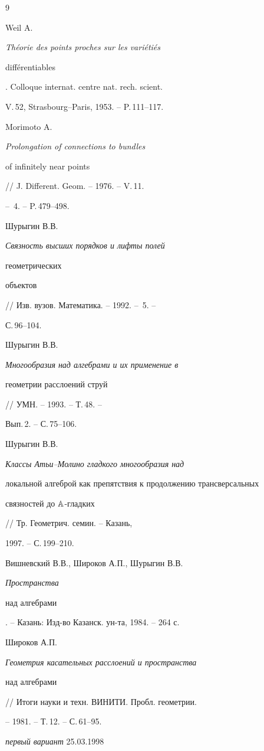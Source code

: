 \begin{thebibliography}{9} 


 




Weil A. {\em Th\'eorie des points proches sur les vari\'eti\'es 


diff\'erentiables}. Colloque internat. centre nat. rech. scient. 


V.\,52, Strasbourg--Paris, 1953. -- P.\,111--117. 




Morimoto A. {\em Prolongation of connections to bundles 


of infinitely near points} // J. Different. Geom. -- 1976. -- V.\,11. 


-- \No\,4. -- P.\,479--498. 




Шурыгин В.В. {\em Связность высших порядков и лифты полей 


геометрических 


объектов} // Изв. вузов. Математика. -- 1992. -- \No\,5. -- 


С.\,96--104. 




Шурыгин В.В. {\em Многообразия над алгебрами и их применение в  


геометрии расслоений струй} // УМН. -- 1993. -- Т.\,48. -- 


Вып.\,2. -- С.\,75--106. 




Шурыгин В.В. {\em Классы Атьи--Молино гладкого многообразия над  


локальной алгеброй как препятствия к продолжению трансверсальных  


связностей до $\Bbb A$-гладких} // Тр. Геометрич. семин. -- Казань, 


1997. -- С.\,199--210. 




Вишневский В.В., Широков А.П., Шурыгин В.В. {\em Пространства 


над алгебрами}. -- Казань: Изд-во Казанск. ун-та, 1984. -- 264 с. 




Широков А.П. {\em Геометрия касательных расслоений и пространства 


над алгебрами} // Итоги науки и техн. ВИНИТИ. Пробл. геометрии. 


-- 1981. -- Т.\,12. -- С.\,61--95. 


 


\end{thebibliography} 


 


\vskip 2cm 


 




% 


{{\it первый вариант} 25.03.1998} 




\label{end} 


 


